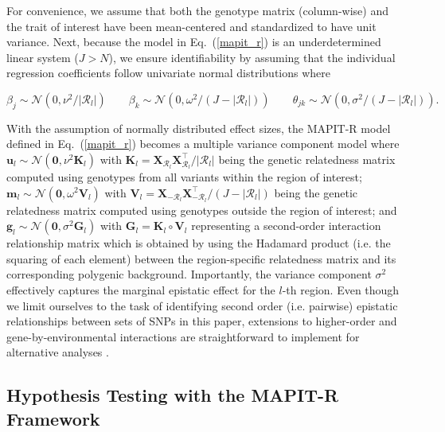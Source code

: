 \documentclass[10pt]{article}
\def\eq#1{(\ref{#1})}
\newcommand{\bg}{\mathbf{g}}
\newcommand{\bu}{\mathbf{u}}
\newcommand{\bfm}{\mathbf{m}}
\newcommand{\bK}{\mathbf{K}}
\newcommand{\bV}{\mathbf{V}}
\newcommand{\bX}{\mathbf{X}}
\newcommand{\bG}{\mathbf{G}}
\newcommand{\T}{\intercal}
\newcommand{\N}{\mathcal{N}}
\begin{document}
For convenience, we assume that both the genotype matrix (column-wise) and the trait of interest have been mean-centered and standardized to have unit variance. Next, because the model in Eq.~\eq{mapit_r} is an underdetermined linear system ($J > N$), we ensure identifiability by assuming that the individual regression coefficients follow univariate normal distributions where 
\begin{linenomath*}
\begin{equation}
\beta_j\sim \N(0,\nu^2/|\mathcal{R}_l|) \quad \quad \beta_k\sim\N(0,\omega^2/(J-|\mathcal{R}_l|)) \quad \quad \theta_{jk}\sim\N(0,\sigma^2/(J-|\mathcal{R}_l|)).\label{coef}
\end{equation}
\end{linenomath*}
With the assumption of normally distributed effect sizes, the MAPIT-R model defined in Eq.~\eq{mapit_r} becomes a multiple variance component model where $\bu_l\sim\N(\bm{0},\nu^2\bK_l)$ with $\bK_l = \bX_{\mathcal{R}_l}\bX_{\mathcal{R}_l}^{\T}/|\mathcal{R}_l|$ being the genetic relatedness matrix computed using genotypes from all variants within the region of interest; $\bfm_l \sim \N(\bm{0}, \omega^2\bV_l)$ with $\bV_l = \bX_{-\mathcal{R}_l}\bX_{-\mathcal{R}_l}^{\T}/(J-|\mathcal{R}_l|)$ being the genetic relatedness matrix computed using genotypes outside the region of interest; and $\bg_l \sim \N(\bm{0},\sigma^2\bG_l)$ with $\bG_l = \bK_l \circ \bV_l$ representing a second-order interaction relationship matrix which is obtained by using the Hadamard product (i.e. the squaring of each element) between the region-specific relatedness matrix and its corresponding polygenic background. Importantly, the variance component $\sigma^2$ effectively captures the marginal epistatic effect for the $l$-th region. Even though we limit ourselves to the task of identifying second order (i.e. pairwise) epistatic relationships between sets of SNPs in this paper, extensions to higher-order and gene-by-environmental interactions are straightforward to implement for alternative analyses \cite{Jiang2015,Crawford2017a,Zhou2017,Crawford2018a,Moore2019}.

\subsection*{Hypothesis Testing with the MAPIT-R Framework}
\end{document}
